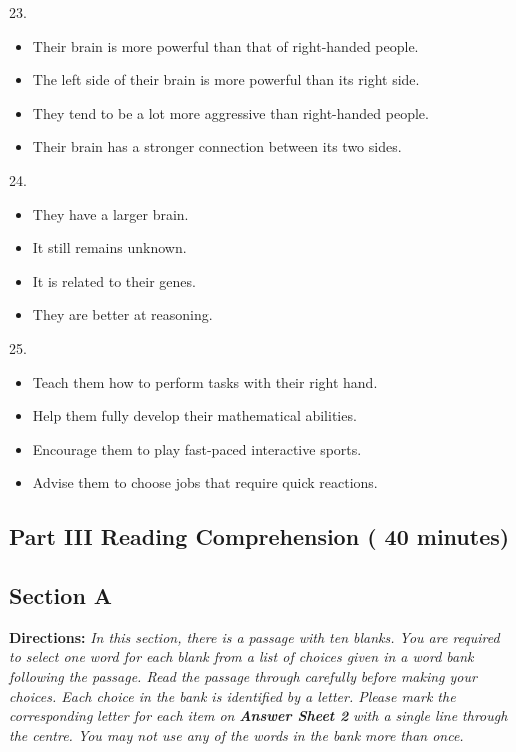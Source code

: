 \documentclass[UTF8,11pt]{ctexart}
\begin{document}
23.


\begin{itemize}[leftmargin=2em,itemsep=.2em,topsep=.4em]\item[A.] Their brain is more powerful than that of right-handed people.
\item[B.] The left side of their brain is more powerful than its right side.
\item[C.] They tend to be a lot more aggressive than right-handed people.
\item[D.] Their brain has a stronger connection between its two sides.
\end{itemize}

24.


\begin{itemize}[leftmargin=2em,itemsep=.2em,topsep=.4em]\item[A.] They have a larger brain.
\item[B.] It still remains unknown.
\item[C.] It is related to their genes.
\item[D.] They are better at reasoning.
\end{itemize}

25.


\begin{itemize}[leftmargin=2em,itemsep=.2em,topsep=.4em]\item[A.] Teach them how to perform tasks with their right hand.
\item[B.] Help them fully develop their mathematical abilities.
\item[C.] Encourage them to play fast-paced interactive sports.
\item[D.] Advise them to choose jobs that require quick reactions.
\end{itemize}

\subsection*{\textbf{Part III Reading Comprehension ( 40 minutes)}}


\subsection*{\textbf{Section A}}


\textbf{Directions:} \textit{In this section, there is a passage with ten blanks. You are required to select one word for each} \textit{blank from a list of choices given in a word bank following the passage. Read the passage through carefully} \textit{before making your choices. Each choice in the bank is identified by a letter. Please mark the corresponding} \textit{letter for each item on }\textbf{\textit{Answer Sheet 2}}\textit{ with a single line through the centre. You may not use any of the words} \textit{in the bank more than once.}
\end{document}
